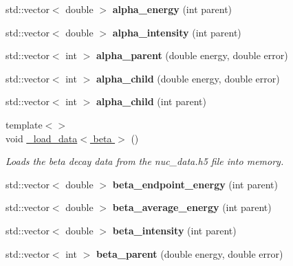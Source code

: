 \begin{DoxyCompactItemize}
std\+::vector$<$ double $>$ {\bfseries alpha\+\_\+energy} (int parent)
\item 
\mbox{\label{namespacepyne_a9060c732198093622687083cce03f9a8}} 
std\+::vector$<$ double $>$ {\bfseries alpha\+\_\+intensity} (int parent)
\item 
\mbox{\label{namespacepyne_a349b73b8c365292fc2b91d1e4fc64154}} 
std\+::vector$<$ int $>$ {\bfseries alpha\+\_\+parent} (double energy, double error)
\item 
\mbox{\label{namespacepyne_ad610784cfca1a49090a15daf49fe21c4}} 
std\+::vector$<$ int $>$ {\bfseries alpha\+\_\+child} (double energy, double error)
\item 
\mbox{\label{namespacepyne_a80cd5a9276515010515462d27f500fbc}} 
std\+::vector$<$ int $>$ {\bfseries alpha\+\_\+child} (int parent)
\item 
\mbox{\label{namespacepyne_ac03b565590e9d917e4f93d65dac36db6}} 
{\footnotesize template$<$$>$ }\\void \hyperlink{namespacepyne_ac03b565590e9d917e4f93d65dac36db6}{\+\_\+load\+\_\+data$<$ beta $>$} ()
\begin{DoxyCompactList}\small\item\em Loads the beta decay data from the nuc\+\_\+data.\+h5 file into memory. \end{DoxyCompactList}\item 
\mbox{\label{namespacepyne_a1b55f98ecca83a9191eb30ee9ce6592b}} 
std\+::vector$<$ double $>$ {\bfseries beta\+\_\+endpoint\+\_\+energy} (int parent)
\item 
\mbox{\label{namespacepyne_ab385d0c04c1da2033bdf0e8309a293cb}} 
std\+::vector$<$ double $>$ {\bfseries beta\+\_\+average\+\_\+energy} (int parent)
\item 
\mbox{\label{namespacepyne_a818e4cda17d0e3746e7c39c452505f03}} 
std\+::vector$<$ double $>$ {\bfseries beta\+\_\+intensity} (int parent)
\item 
\mbox{\label{namespacepyne_a4f6a73d374babad7eae37b1a5ede31b1}} 
std\+::vector$<$ int $>$ {\bfseries beta\+\_\+parent} (double energy, double error)

\end{DoxyCompactItemize}
